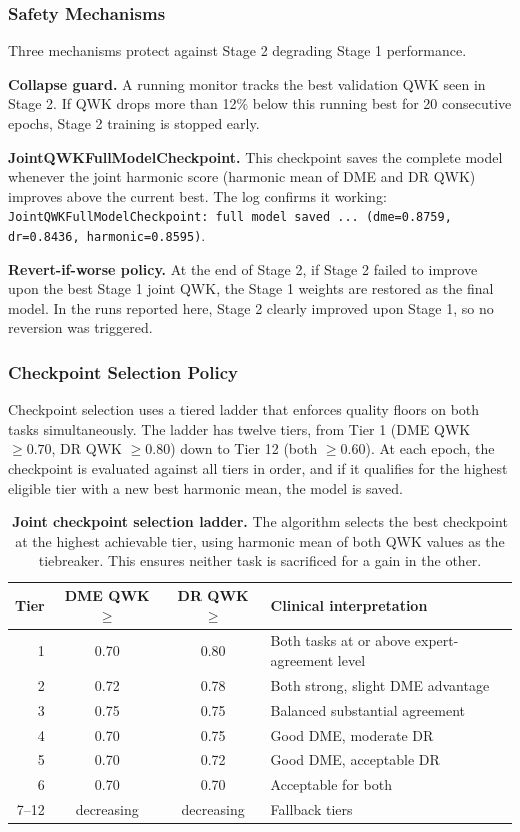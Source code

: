 \documentclass[12pt,a4paper]{article}
\begin{document}
\subsubsection{Safety Mechanisms}

Three mechanisms protect against Stage 2 degrading Stage 1 performance.

\textbf{Collapse guard.} A running monitor tracks the best validation QWK seen in Stage 2. If QWK drops more than 12\% below this running best for 20 consecutive epochs, Stage 2 training is stopped early.

\textbf{JointQWKFullModelCheckpoint.} This checkpoint saves the complete model whenever the joint harmonic score (harmonic mean of DME and DR QWK) improves above the current best. The log confirms it working: \texttt{JointQWKFullModelCheckpoint: full model saved ... (dme=0.8759, dr=0.8436, harmonic=0.8595)}.

\textbf{Revert-if-worse policy.} At the end of Stage 2, if Stage 2 failed to improve upon the best Stage 1 joint QWK, the Stage 1 weights are restored as the final model. In the runs reported here, Stage 2 clearly improved upon Stage 1, so no reversion was triggered.

\subsubsection{Checkpoint Selection Policy}

Checkpoint selection uses a tiered ladder that enforces quality floors on both tasks simultaneously. The ladder has twelve tiers, from Tier 1 (DME QWK $\geq 0.70$, DR QWK $\geq 0.80$) down to Tier 12 (both $\geq 0.60$). At each epoch, the checkpoint is evaluated against all tiers in order, and if it qualifies for the highest eligible tier with a new best harmonic mean, the model is saved.

\begin{table}[H]
\centering
\small
\caption{\textbf{Joint checkpoint selection ladder.} The algorithm selects the best checkpoint at the highest achievable tier, using harmonic mean of both QWK values as the tiebreaker. This ensures neither task is sacrificed for a gain in the other.}
\begin{tabular}{|r|c|c|l|}
\hline
\textbf{Tier} & \textbf{DME QWK $\geq$} & \textbf{DR QWK $\geq$} & \textbf{Clinical interpretation} \\
\hline
1 & 0.70 & 0.80 & Both tasks at or above expert-agreement level \\
2 & 0.72 & 0.78 & Both strong, slight DME advantage \\
3 & 0.75 & 0.75 & Balanced substantial agreement \\
4 & 0.70 & 0.75 & Good DME, moderate DR \\
5 & 0.70 & 0.72 & Good DME, acceptable DR \\
6 & 0.70 & 0.70 & Acceptable for both \\
7--12 & decreasing & decreasing & Fallback tiers \\
\hline
\end{tabular}
\end{table}
\end{document}
